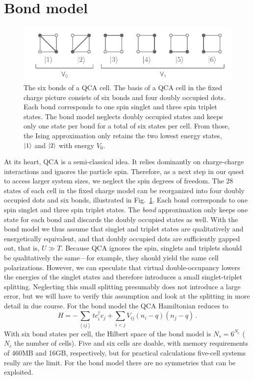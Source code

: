 \section{Bond model}

%
\begin{figure}
  \center
  \includegraphics{bond}
  \caption{
  The six bonds of a QCA cell. The basis of a QCA cell in the fixed charge
  picture consists of six bonds and four doubly occupied dots. Each bond
  corresponds to one spin singlet and three spin triplet states. The bond model
  neglects doubly occupied states and keeps only one state per bond for a total
  of six states per cell. From those, the Ising approximation only retains
  the two lowest energy states, $\left|1\right>$ and $\left|2\right>$ with energy $V_0$.
  }
  \label{fig:bond}
\end{figure}
%
At its heart, QCA is a semi-classical idea. It relies dominantly on
charge-charge interactions and ignores the particle spin. Therefore, as a next
step in our quest to access larger system sizes, we neglect the spin degrees of
freedom. The 28 states of each cell in the fixed charge model can be reorganized
into four doubly occupied dots and six bonds, illustrated in
Fig.~\ref{fig:bond}. Each bond corresponds to one spin singlet and three spin
triplet states. The \emph{bond} approximation only keeps one state for each bond
and discards the doubly occupied states as well. With the bond model we thus
assume that singlet and triplet states are qualitatively and energetically
equivalent, and that doubly occupied dots are sufficiently gapped out, that is,
$U \gg T$. Because QCA ignores the spin, singlets and triplets should be
qualitatively the same---for example, they should yield the same cell
polarizations. However, we can speculate that virtual double-occupancy lowers
the energies of the singlet states and therefore introduces a small
singlet-triplet splitting. Neglecting this small splitting presumably does not
introduce a large error, but we will have to verify this assumption and look at
the splitting in more detail in due course. For the bond model the QCA
Hamiltonian reduces to
%
\begin{equation}
  \label{eq:H_bond}
  H = - \sum_{\left<ij\right>} t c_i^{\dagger} c_j
      + \sum_{i<j} V_{ij} \left( n_i - q \right) \left( n_j - q \right) \, .
\end{equation}
%
With six bond states per cell, the Hilbert space of the bond model is $N_s =
6^{N_c}$ ($N_c$ the number of cells). Five and six cells are doable, with memory
requirements of 460MB and 16GB, respectively, but for practical calculations
five-cell systems really are the limit. For the bond model there are no
symmetries that can be exploited.



